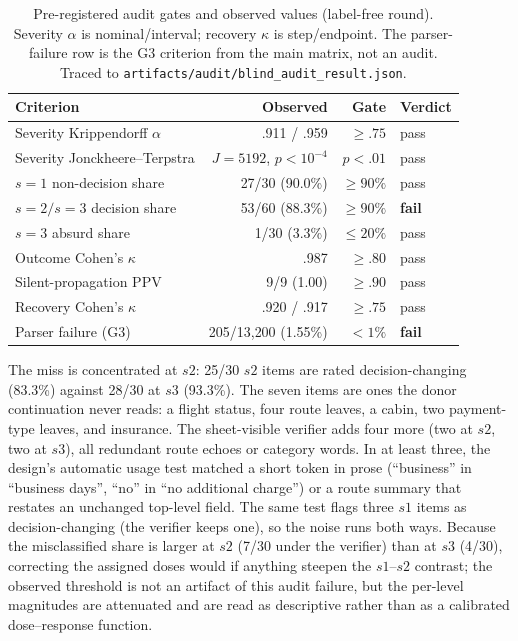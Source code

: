 \documentclass[a4paper,fleqn]{cas-sc}
\begin{document}
\begin{table}[pos=htbp]
  \centering
  \caption{Pre-registered audit gates and observed values (label-free round). Severity $\alpha$
  is nominal/interval; recovery $\kappa$ is step/endpoint. The parser-failure row is the G3
  criterion from the main matrix, not an audit. Traced to
  \texttt{artifacts/audit/blind\_audit\_result.json}.}
  \label{tab:audit}
  \small
  \begin{tabular}{lrrl}
    \toprule
    \textbf{Criterion} & \textbf{Observed} & \textbf{Gate} & \textbf{Verdict} \\
    \midrule
    Severity Krippendorff $\alpha$ & .911 / .959 & $\ge .75$ & pass \\
    Severity Jonckheere--Terpstra & $J=5192$, $p<10^{-4}$ & $p<.01$ & pass \\
    $s=1$ non-decision share & 27/30 (90.0\%) & $\ge 90\%$ & pass \\
    $s=2/s=3$ decision share & 53/60 (88.3\%) & $\ge 90\%$ & \textbf{fail} \\
    $s=3$ absurd share & 1/30 (3.3\%) & $\le 20\%$ & pass \\
    Outcome Cohen's $\kappa$ & .987 & $\ge .80$ & pass \\
    Silent-propagation PPV & 9/9 (1.00) & $\ge .90$ & pass \\
    Recovery Cohen's $\kappa$ & .920 / .917 & $\ge .75$ & pass \\
    Parser failure (G3) & 205/13{,}200 (1.55\%) & $<1\%$ & \textbf{fail} \\
    \bottomrule
  \end{tabular}
\end{table}

The miss is concentrated at $s2$: 25/30 $s2$ items are rated decision-changing (83.3\%) against
28/30 at $s3$ (93.3\%). The seven items are ones the donor continuation never reads: a flight
status, four route leaves, a cabin, two payment-type leaves, and insurance. The sheet-visible
verifier adds four more (two at $s2$, two at $s3$), all redundant route echoes or category words.
In at least
three, the design's automatic usage test matched a short token in prose (``business'' in
``business days'', ``no'' in ``no additional charge'') or a route summary that restates an
unchanged top-level field. The same test flags three $s1$ items as decision-changing (the
verifier keeps one), so the noise runs both ways. Because the misclassified share is larger at
$s2$ (7/30 under the verifier) than at $s3$ (4/30), correcting the
assigned doses would if anything steepen the $s1$--$s2$ contrast; the observed threshold is not an
artifact of this audit failure, but the per-level magnitudes are attenuated and are read as
descriptive rather than as a calibrated dose--response function.
\end{document}
